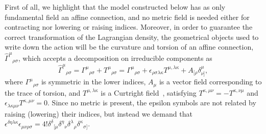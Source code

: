 \documentclass[aps,prd,12pt,twocolumn,superscriptaddress,showpacs,showkeys,reprint%
]{revtex4-1}
\renewcommand{\(}{\left(}
\renewcommand{\)}{\right)}
\renewcommand{\[}{\left[}
\renewcommand{\]}{\right]}
\begin{document}
First of all, we highlight that the model constructed below has as only fundamental field an affine connection, and no metric field is needed either for contracting nor lowering or raising indices. Moreover, in order to guarantee the correct transformation of the Lagrangian density, the geometrical objects used to write down the action will be the curvature and torsion of an affine connection, $\hat{\Gamma}^\mu{}_{\rho\sigma}$, which accepts a decomposition on irreducible components as
\begin{equation}
  \hat{\Gamma}^\mu{}_{\rho\sigma} = {\Gamma}^\mu{}_{\rho\sigma} + T^\mu{}_{\rho\sigma} = {\Gamma}^\mu{}_{\rho\sigma} + \epsilon_{\rho\sigma\lambda\kappa}T^{\mu,\lambda\kappa}+A_{[\rho}\delta^\mu_{\nu]},
\end{equation}
where ${\Gamma}^\mu{}_{\rho\sigma}$ is symmetric in the lower indices, $A_\mu$ is a vector field corresponding to the trace of torsion, and  $T^{\mu,\lambda\kappa}$ is a Curtright field~\cite{Curtright:1980yk}, satisfying \mbox{$T^{\kappa,\mu\nu } = - T^{\kappa,\nu\mu }$} and $\epsilon_{\lambda\kappa\mu\nu}T^{\kappa,\mu\nu }=0$. Since no metric is present, the epsilon symbols are not related by raising (lowering) their indices, but instead we demand that \mbox{$\epsilon^{\delta\eta\lambda\kappa}\epsilon_{\mu\nu\rho\sigma}=4!\delta^{\delta}{}_{[\mu}\delta^\eta{}_{\nu}\delta^{\lambda}{}_{\rho} \delta^\kappa{}_{\sigma]}$.}
\end{document}
